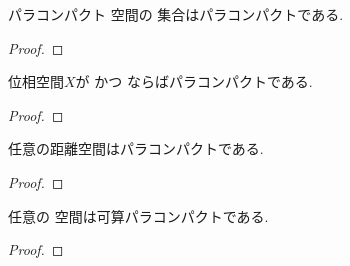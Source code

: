\documentclass[uplatex, dvipdfmx, a4paper, 12pt, class=jsbook, crop=false]{standalone}
\begin{document}
\begin{proposition}
	パラコンパクト \Hausdorff 空間の \Fsigma 集合はパラコンパクトである.
\end{proposition}
\begin{proof}
	\WIP
\end{proof}

\begin{theorem}
	位相空間$ X $が  かつ \Lindelof ならばパラコンパクトである.
\end{theorem}
\begin{proof}
	\WIP
\end{proof}

\begin{theorem}[A. H. Stone]
	任意の距離空間はパラコンパクトである.
\end{theorem}
\begin{proof}
	\WIP
\end{proof}

\begin{proposition}
	任意の  空間は可算パラコンパクトである.
\end{proposition}
\begin{proof}
	\WIP
\end{proof}
\end{document}
